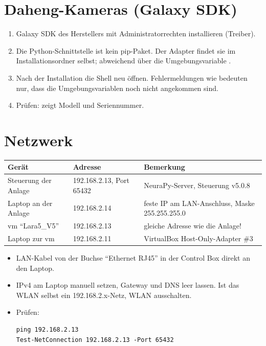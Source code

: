 \section{Daheng-Kameras (Galaxy SDK)}

\begin{enumerate}
  \item Galaxy SDK des Herstellers mit Administratorrechten installieren (Treiber).
  \item Die Python-Schnittstelle  ist kein pip-Paket. Der Adapter findet sie im
    Installationsordner selbst; abweichend über die Umgebungsvariable
    .
  \item Nach der Installation die Shell neu öffnen. Fehlermeldungen wie
     bedeuten nur, dass die Umgebungsvariablen noch nicht
    angekommen sind.
  \item Prüfen:  zeigt Modell und Seriennummer.
\end{enumerate}


\section{Netzwerk}
\label{sec:netzwerk}

\begin{table}[htbp]
  \centering
  \small
  \begin{tabularx}{\textwidth}{@{}l l X@{}}
    \toprule
    Gerät & Adresse & Bemerkung \\
    \midrule
    Steuerung der Anlage & 192.168.2.13, Port 65432 & NeuraPy-Server, Steuerung v5.0.8 \\
    Laptop an der Anlage & 192.168.2.14 & feste IP am LAN-Anschluss, Maske 255.255.255.0 \\
    \acs{vm} \enquote{Lara5\_V5} & 192.168.2.13 & gleiche Adresse wie die Anlage! \\
    Laptop zur \acs{vm} & 192.168.2.11 & VirtualBox Host-Only-Adapter \#3 \\
    \bottomrule
  \end{tabularx}
\end{table}

\begin{itemize}
  \item LAN-Kabel von der Buchse \enquote{Ethernet RJ45} in der Control Box direkt an den Laptop.
  \item IPv4 am Laptop manuell setzen, Gateway und DNS leer lassen. Ist das WLAN selbst ein
    192.168.2.x-Netz, WLAN ausschalten.
  \item Prüfen:
\begin{lstlisting}[style=ps]
ping 192.168.2.13
Test-NetConnection 192.168.2.13 -Port 65432
\end{lstlisting}
\end{itemize}

